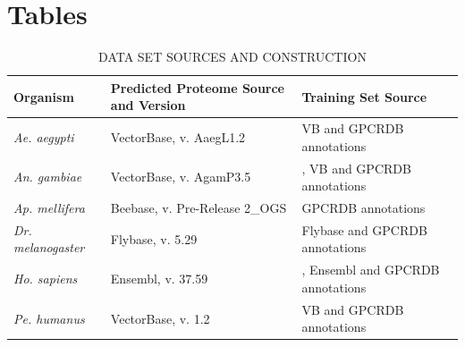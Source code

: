 \section{Tables}


\begin{table}[H]
  \centering
  \caption{\label{tab:data-sources} \uppercase{Data Set Sources and Construction}}
  \footnotesize
  \begin{tabular}{| l | p{5cm} | p{5cm} |}
    \hline
    \textbf{Organism} & \textbf{Predicted Proteome Source and Version} & \textbf{Training Set Source} \\ \hline
    \emph{Ae. aegypti} & VectorBase, v. AaegL1.2 & VB and GPCRDB annotations \\ \hline
    \emph{An. gambiae} & VectorBase, v. AgamP3.5 & \cite{Hill2002}, VB and GPCRDB annotations \\ \hline
    \emph{Ap. mellifera} & Beebase, v. Pre-Release 2\_OGS & GPCRDB annotations \\ \hline
    \emph{Dr. melanogaster} & Flybase, v. 5.29 & Flybase and GPCRDB annotations \\ \hline
    \emph{Ho. sapiens} & Ensembl, v. 37.59 & \cite{Zhang2006}, Ensembl and GPCRDB annotations \\ \hline
    \emph{Pe. humanus} & VectorBase, v. 1.2 & VB and GPCRDB annotations \\ \hline
  \end{tabular}
\end{table}

